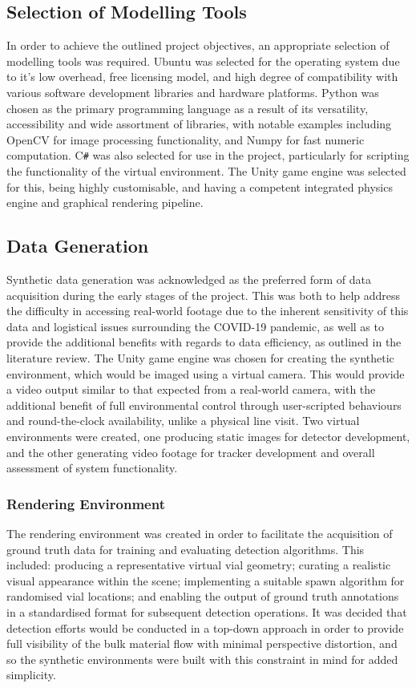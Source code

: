 \documentclass[10pt]{article}
\begin{document}
\subsection{Selection of Modelling Tools}
In order to achieve the outlined project objectives, an appropriate selection of modelling tools was required. Ubuntu \cite{ubuntu} was selected for the operating system due to it's low overhead, free licensing model, and high degree of compatibility with various software development libraries and hardware platforms. Python \cite{python} was chosen as the primary programming language as a result of its versatility, accessibility and wide assortment of libraries, with notable examples including OpenCV \cite{opencv} for image processing functionality, and Numpy \cite{numpy} for fast numeric computation. C\texttt{\#} was also selected for use in the project, particularly for scripting the functionality of the virtual environment. The Unity game engine \cite{unity} was selected for this, being highly customisable, and having a competent integrated physics engine and graphical rendering pipeline.

\subsection{Data Generation}
Synthetic data generation was acknowledged as the preferred form of data acquisition during the early stages of the project. This was both to help address the difficulty in accessing real-world footage due to the inherent sensitivity of this data and logistical issues surrounding the COVID-19 pandemic, as well as to provide the additional benefits with regards to data efficiency, as outlined in the literature review. The Unity game engine was chosen for creating the synthetic environment, which would be imaged using a virtual camera. This would provide a video output similar to that expected from a real-world camera, with the additional benefit of full environmental control through user-scripted behaviours and round-the-clock availability, unlike a physical line visit. Two virtual environments were created, one producing static images for detector development, and the other generating video footage for tracker development and overall assessment of system functionality.

\subsubsection{Rendering Environment}
The rendering environment was created in order to facilitate the acquisition of ground truth data for training and evaluating detection algorithms. This included: producing a representative virtual vial geometry; curating a realistic visual appearance within the scene; implementing a suitable spawn algorithm for randomised vial locations; and enabling the output of ground truth annotations in a standardised format for subsequent detection operations. It was decided that detection efforts would be conducted in a top-down approach in order to provide full visibility of the bulk material flow with minimal perspective distortion, and so the synthetic environments were built with this constraint in mind for added simplicity.
\end{document}
